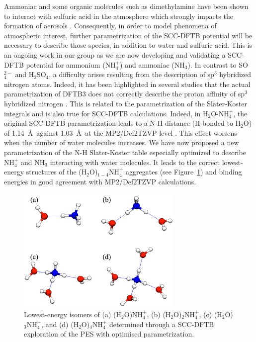 \documentclass[]{interact}
\theoremstyle{plain}%
\theoremstyle{definition}
\theoremstyle{remark}
\begin{document}
Ammoniac and some organic molecules such as dimethylamine have been shown to interact with sulfuric acid in
the atmosphere which strongly impacts the formation of aerosols \cite{Metzger2010,Schobesberger2013,Kurten2014,Lehtipalo2016}.
Consequently, in order to model phenomena of atmospheric interest, further parametrization of the SCC-DFTB potential will
be necessary to describe those species, in addition to water and sulfuric acid. This is an ongoing work in our group
as we are now developing and validating a SCC-DFTB potential for ammonium (NH$_{4}^{+}$) and ammoniac (NH$_{3}$).
In contrast to  SO$_{4}^{2-}$ and H$_{2}$SO$_{4}$, a difficulty arises resulting from the description of sp$^{3}$ hybridized
nitrogen atoms. Indeed, it has been highlighted in several studies that the actual parametrization of DFTB3 does not
correctly describe the proton affinity of sp$^{3}$ hybridized nitrogen \cite{Gaus2011,Gaus2013,Gaus2014}. This is
related to the parametrization of the Slater-Koster integrals and is also true for SCC-DFTB calculations. Indeed, in
H$_{2}$O-NH$_{4}^{+}$, the original SCC-DFTB  parametrization leads to a N-H distance (H-bonded to H$_{2}$O) of
1.14~\AA~against 1.03~\AA~at the MP2/Def2TZVP level \cite{Weigend2005,Weigend2006}. This effect worsens when the
number of water molecules increases. We have now proposed a new parametrization of the N-H Slater-Koster table
especially optimized  to describe NH$_{4}^{+}$ and NH$_{3}$ interacting with water molecules. It leads to the correct
 lowest-energy structures of the (H$_{2}$O)$_{1-4}$NH$_{4}^{+}$ aggregates (see Figure~\ref{ammonium}) and
 binding energies in good agreement with MP2/Def2TZVP calculations.

\begin{figure}
\begin{center}
\includegraphics[width=8cm]{ammonium.png}
\end{center}
\caption{Lowest-energy isomers of (a)  (H$_{2}$O)NH$_{4}^{+}$, (b) (H$_{2}$O)$_{2}$NH$_{4}^{+}$, (c) 
(H$_{2}$O)$_{3}$NH$_{4}^{+}$, and (d) (H$_{2}$O)$_{4}$NH$_{4}^{+}$ determined through a SCC-DFTB
exploration of the PES with optimised parametrization.}
\label{ammonium}
\end{figure}
\end{document}
